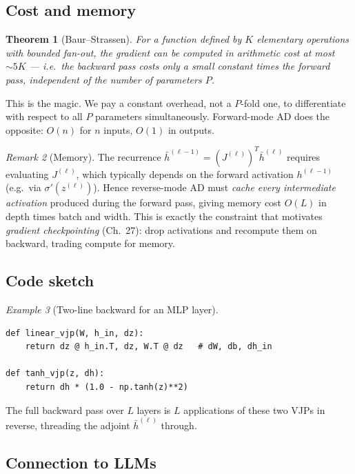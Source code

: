 \documentclass[11pt]{article}
\newtheorem{theorem}{Theorem}[section]
\theoremstyle{remark}
\newtheorem{example}[theorem]{Example}
\newtheorem{remark}[theorem]{Remark}
\begin{document}
\subsection*{Cost and memory}

\begin{theorem}[Baur--Strassen]
For a function defined by $K$ elementary operations with bounded fan-out, the
gradient can be computed in arithmetic cost at most $\sim 5K$ — i.e.\ the
backward pass costs only a small constant times the forward pass,
\emph{independent of the number of parameters $P$}.
\end{theorem}

This is the magic. We pay a constant overhead, not a $P$-fold one, to
differentiate with respect to all $P$ parameters simultaneously. Forward-mode
AD does the opposite: $O(n)$ for $n$ inputs, $O(1)$ in outputs.

\begin{remark}[Memory]
The recurrence $\bar h^{(\ell-1)}=(J^{(\ell)})^{T}\bar h^{(\ell)}$ requires
evaluating $J^{(\ell)}$, which typically depends on the forward activation
$h^{(\ell-1)}$ (e.g.\ via $\sigma'(z^{(\ell)})$). Hence reverse-mode AD must
\emph{cache every intermediate activation} produced during the forward pass,
giving memory cost $O(L)$ in depth times batch and width. This is exactly the
constraint that motivates \emph{gradient checkpointing} (Ch.~27): drop
activations and recompute them on backward, trading compute for memory.
\end{remark}

\subsection*{Code sketch}

\begin{example}[Two-line backward for an MLP layer]
\begin{verbatim}
def linear_vjp(W, h_in, dz):
    return dz @ h_in.T, dz, W.T @ dz   # dW, db, dh_in

def tanh_vjp(z, dh):
    return dh * (1.0 - np.tanh(z)**2)
\end{verbatim}
The full backward pass over $L$ layers is $L$ applications of these two VJPs in
reverse, threading the adjoint $\bar h^{(\ell)}$ through.
\end{example}

\subsection*{Connection to LLMs}
\end{document}
